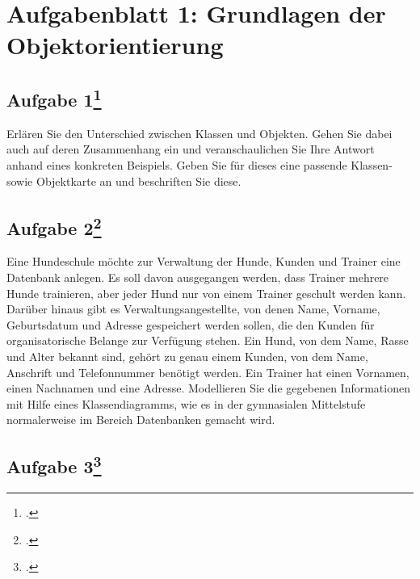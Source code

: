 \documentclass{lehramt-informatik-haupt}
\begin{document}
\chapter{Aufgabenblatt 1: Grundlagen der Objektorientierung}

%

\section{Aufgabe 1\footcite{oomup:ab:1}}

Erlären Sie den Unterschied zwischen Klassen und Objekten. Gehen Sie
dabei auch auf deren Zusammenhang ein und veranschaulichen Sie Ihre
Antwort anhand eines konkreten Beispiels. Geben Sie für dieses eine
passende Klassen- sowie Objektkarte an und beschriften Sie diese.

%

\section{Aufgabe 2\footcite{oomup:ab:1}}

Eine Hundeschule möchte zur Verwaltung der Hunde, Kunden und Trainer
eine Datenbank anlegen. Es soll davon ausgegangen werden, dass Trainer
mehrere Hunde trainieren, aber jeder Hund nur von einem Trainer geschult
werden kann. Darüber hinaus gibt es Verwaltungsangestellte, von denen
Name, Vorname, Geburtsdatum und Adresse gespeichert werden sollen, die
den Kunden für organisatorische Belange zur Verfügung stehen. Ein Hund,
von dem Name, Rasse und Alter bekannt sind, gehört zu genau einem
Kunden, von dem Name, Anschrift und Telefonnummer benötigt werden. Ein
Trainer hat einen Vornamen, einen Nachnamen und eine Adresse.
Modellieren Sie die gegebenen Informationen mit Hilfe eines
Klassendiagramms, wie es in der gymnasialen Mittelstufe normalerweise im
Bereich Datenbanken gemacht wird.

%

\section{Aufgabe 3\footcite{oomup:ab:1}}
\end{document}

